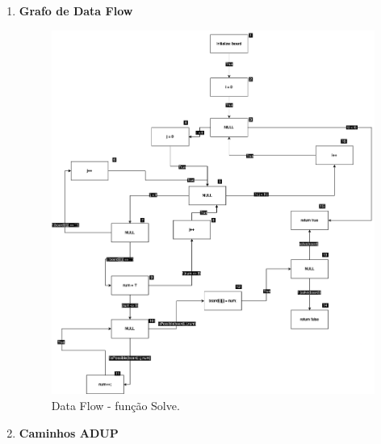 \documentclass{article}
\begin{document}
\begin{itemize}
       
    \begin{enumerate}
        
        \item \textbf{Grafo de Data Flow}
    \begin{figure}[H]
    \centering
    \includegraphics[width=\textwidth]{Images/DataFlowSudoku.drawio.png}
    \caption{Data Flow - função Solve.} 
    \label{fig:DataFlow-Solve}

    \end{figure}
    \item \textbf{Caminhos ADUP}\\
    

\end{enumerate}
\end{itemize}
\end{document}
